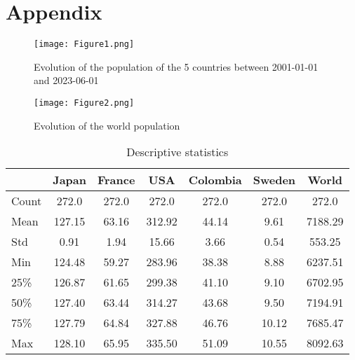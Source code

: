 \documentclass[hidelinks,11pts]{article}
\DeclareMathOperator{\1}{\mathbbm{1}}
\begin{document}
\newpage
\section*{Appendix}
 


\begin{figure}[h]
    \centering
    \texttt{[image: Figure1.png]}
    \caption{Evolution of the population of the 5 countries between 2001-01-01 and 2023-06-01}
    \label{fig:enter-label}
\end{figure}

\begin{figure}[h]
    \centering
    \texttt{[image: Figure2.png]}
    \caption{Evolution of the world population}
    \label{fig:enter-label}
\end{figure}


\begin{table}[htbp]
  \centering
  \caption{Descriptive statistics}
  \begin{tabular}{lcccccc}
    \toprule
    & Japan & France & USA & Colombia & Sweden & World \\
    \midrule
    Count & 272.0 & 272.0 & 272.0 & 272.0 & 272.0 & 272.0 \\
    Mean & 127.15 & 63.16 & 312.92 & 44.14 & 9.61 & 7188.29 \\
    Std & 0.91 & 1.94 & 15.66 & 3.66 & 0.54 & 553.25 \\
    Min & 124.48 & 59.27 & 283.96 & 38.38 & 8.88 & 6237.51 \\
    25\% & 126.87 & 61.65 & 299.38 & 41.10 & 9.10 & 6702.95 \\
    50\% & 127.40 & 63.44 & 314.27 & 43.68 & 9.50 & 7194.91 \\
    75\% & 127.79 & 64.84 & 327.88 & 46.76 & 10.12 & 7685.47 \\
    Max & 128.10 & 65.95 & 335.50 & 51.09 & 10.55 & 8092.63 \\
    \bottomrule
  \end{tabular}
  \label{tab:desc}
\end{table}
\end{document}
